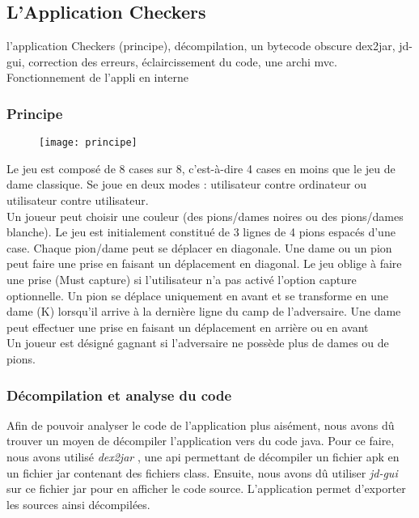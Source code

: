 
\subsection{L'Application Checkers}

l'application Checkers (principe), décompilation, un bytecode obscure
dex2jar, jd-gui, correction des erreurs, éclaircissement du code, une archi mvc.
Fonctionnement de l'appli en interne
\subsubsection{Principe}
\begin{figure}[hp]
	      \begin{center}
		\texttt{[image: principe]}
	      \end{center}
\end{figure}

Le jeu est composé de 8 cases sur 8, c’est-à-dire 4 cases en moins que le jeu de dame classique.  Se joue en deux modes : utilisateur contre ordinateur ou utilisateur contre utilisateur.\\
Un joueur peut choisir une couleur (des pions/dames noires ou des pions/dames blanche).  Le jeu est initialement constitué de 3 lignes de 4 pions espacés d’une case. Chaque pion/dame peut se déplacer en diagonale. 
Une dame ou un pion peut faire une prise en faisant un déplacement en diagonal. Le jeu oblige à faire une prise (Must capture) si l'utilisateur n'a pas activé l'option capture optionnelle. 
Un pion se déplace uniquement en avant et se transforme en une dame (K) lorsqu’il arrive à la dernière ligne du camp de l’adversaire. Une dame peut effectuer une prise en faisant un déplacement en arrière ou en avant\\
Un joueur est désigné gagnant si l’adversaire ne possède plus de dames ou de pions.

\subsubsection{Décompilation et analyse du code}

Afin de pouvoir analyser le code de l'application plus aisément, nous avons dû trouver un moyen de décompiler l'application vers du code java.
Pour ce faire, nous avons utilisé \textit{dex2jar} \cite{dex2jar},
une api permettant de décompiler un fichier apk en un fichier jar contenant des fichiers class.
Ensuite, nous avons dû utiliser \textit{jd-gui} \cite{jdgui} sur ce fichier jar pour en afficher le code source.
L'application permet d'exporter les sources ainsi décompilées.

